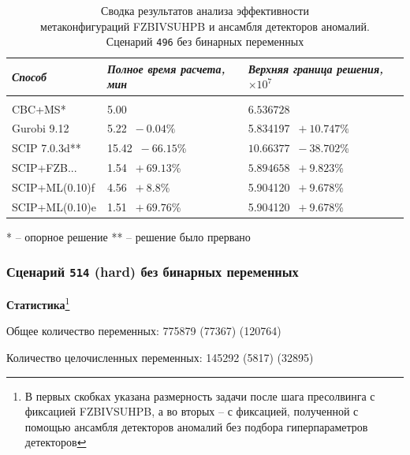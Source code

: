 \documentclass[%
	11pt,
	a4paper,
	utf8,
		]{article}
\begin{document}
{
	\begin{table}[!h]
		\centering
		\caption{Сводка результатов анализа эффективности \\метаконфигураций FZBIVSUHPB и ансамбля детекторов аномалий. \\Сценарий \texttt{496} без бинарных переменных}
		\begin{tabular}{ p{2.7cm} p{3.3cm} p{3.4cm} }
			\emph{Способ} & \emph{Полное время расчета, мин} & \emph{Верхняя граница решения, $ \times 10^{7} $} \\
			\hline\hline\\[-3.5mm]
			{CBC+MS}* & 5.00 & $ 6.536728 $ \\
			\hline
			Gurobi 9.12 & 5.22 {\color{red} $ \ - 0.04\% $} & 5.834197 {\color{blue} $ \ +10.747\% $}\\
			\hline
			SCIP 7.0.3d** & 15.42 {\color{red} $\ -66.15 $\%} & $ 10.66377 $ {\color{red} $\ -38.702 $\%} \\
			\hline
			SCIP+FZB... & 1.54 {\color{blue} $\ +69.13 $\%} & $ 5.894658 $ {\color{blue} $\ +9.823 $\%} \\
			\hline
			SCIP+ML(0.10)f & 4.56 {\color{blue} $\ +8.8 $\%} & 5.904120 {\color{blue} $\ +9.678 $\%} \\
			\hline
			SCIP+ML(0.10)e & 1.51 {\color{blue} $\ +69.76 $\%} & 5.904120 {\color{blue} $\ +9.678 $\%} 
		\end{tabular}\label{tab:496_wo_bins}
	\end{table}
\vspace*{-5mm}\hspace{30mm}\small{* -- опорное решение}
\hspace{15mm}\small{** -- решение было прервано}
}


\subsubsection{Сценарий \texttt{514} (hard) без бинарных переменных}

\textbf{Статистика}\footnote{В первых скобках указана размерность задачи после шага пресолвинга с фиксацией FZBIVSUHPB, а во вторых -- с фиксацией, полученной с помощью ансамбля детекторов аномалий без подбора гиперпараметров детекторов}\vspace*{1mm}

Общее количество переменных: 775879 (77367) (120764)

Количество целочисленных переменных: 145292 (5817) (32895)
\end{document}

